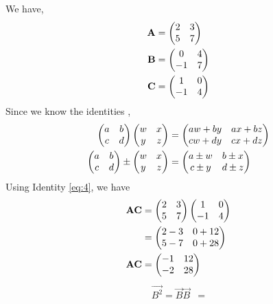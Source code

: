\documentclass[journal,12pt,twocolumn]{IEEEtran}
\renewcommand\thesection{\arabic{section}}
\begin{document}
\begin{enumerate}[label=\thesection.\arabic*.,ref=\thesection.\theenumi]
  \solution We have,
    \begin{align}  
      \mathbf{A}&= \begin{pmatrix}
        2 & 3 \\
        5 & 7 \\
      \end{pmatrix}\label{eq:1}
      \\ 
      \mathbf{B}&=\begin{pmatrix} 
        0 & 4 \\
        -1 & 7 \\
      \end{pmatrix}\label{eq:2}
      \\
      \mathbf{C}&= \begin{pmatrix}
        1 & 0 \\
        -1 & 4 \\
      \end{pmatrix}\label{eq:3}
    \end{align}
    Since we know the identities ,
    \begin{align}
     \begin{pmatrix} 
        a & b \\
        c & d \\
      \end{pmatrix} 
     \begin{pmatrix} 
        w & x \\
        y & z \\
      \end{pmatrix} 
      &=
     \begin{pmatrix} 
        aw+by & ax+bz \\
        cw+dy & cx+dz \\
     \end{pmatrix} \label{eq:4}
    \\
     \begin{pmatrix} 
        a & b \\
        c & d
      \end{pmatrix} 
      \pm
     \begin{pmatrix} 
        w & x \\
        y & z
      \end{pmatrix} 
      &=
     \begin{pmatrix} 
        a\pm w & b\pm x \\
        c\pm y & d\pm z
      \end{pmatrix} \label{eq:5}
    \end{align}  
    Using Identity \eqref{eq:4}, we have
      \begin{align}
          \mathbf{A}\mathbf{C}&=
          \begin{pmatrix} 
              2 & 3 \\
              5 & 7
            \end{pmatrix} 
          \begin{pmatrix} 
              1 & 0 \\
              -1 & 4
          \end{pmatrix} 
          \\
          &=\begin{pmatrix} 
              2-3 & 0+12 \\
              5-7 & 0+28
          \end{pmatrix} 
          \\
          \mathbf{A}\mathbf{C}&=
          \begin{pmatrix} 
              -1 & 12 \\
              -2 & 28 
          \end{pmatrix}\label{eq:8} 
      \end{align}
      \begin{align}
          \vec{B^2}=\vec{B}\vec{B}
          &=

\end{align}
\end{enumerate}
\end{document}
